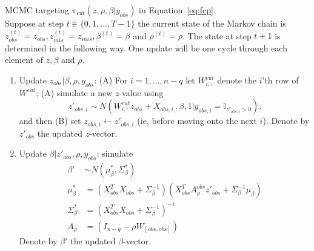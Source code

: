 \documentclass{article}
\begin{document}
\begin{algorithm}
    \vspace*{0.1in}
	MCMC targeting $\pi_{cut}(z, \rho, \beta | y_{obs} )$ in Equation~\ref{eq:fcp}. \\[0.05in]

    Suppose at step $t\in \{0,1,...,T-1\}$ the current state of the Markov chain is
    $z^{(t)}_{obs}=z_{obs},z^{(t)}_{mis}=z_{mis},\beta^{(t)}=\beta$ and $\rho^{(t)}=\rho$. The state at step $t+1$ is determined in the following way.
    One update will be one cycle through each element of $z,\beta$ and $\rho$.
    \begin{enumerate}
    \item Update $z_{obs}|\beta,\rho,y_{obs}$: (A) For $i=1,...,n-q$ let $W^{cut}_{i,:}$ denote the $i$'th row of $W^{cut}$; (A) simulate a new $z$-value using
    \[
    z'_{obs,i}\sim N(W^{cut}_{i,:}z_{obs}+X_{obs,i,:}\beta,1|y_{obs,i} = \mathbb{I}_{z'_{obs,i} > 0}).
    \]
    and then (B) set $z_{obs,i}\leftarrow z'_{obs,i}$ (ie, before moving onto the next $i$). Denote by
    $z'_{obs}$ the updated $z$-vector.

	\item Update $\beta|z'_{obs},\rho,y_{obs}$: simulate
    \begin{align*}
        \beta' &\sim N(\mu^*_\beta, \Sigma_{\beta}^*) \\
    	\mu_\beta^* &= (X_{obs}^T X_{obs} + \Sigma_\beta^{-1})  (X_{obs}^T A^{obs}_\rho z'_{obs} + \Sigma_\beta^{-1} \mu_\beta) \\
    	\Sigma_\beta^* &= (X_{obs}^T X_{obs} + \Sigma_\beta^{-1}) ^ {-1} \\
        A_\rho &= (I_{n-q} - \rho W_{[obs,obs]})
	\end{align*}
	Denote by $\beta'$ the updated $\beta$-vector.


\end{enumerate}
\end{algorithm}
\end{document}
